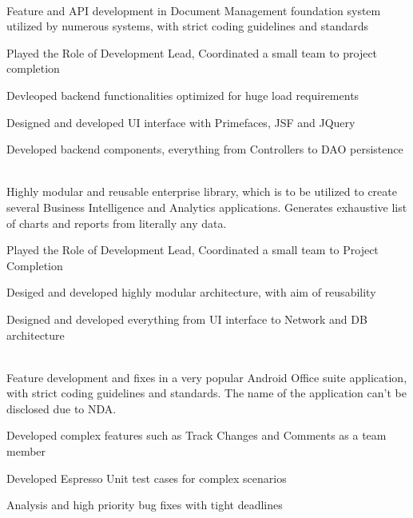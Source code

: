 \documentclass[]{deedy-resume-openfont}
\begin{document}
\hfill {}\\
Feature and API development in Document Management foundation system utilized by numerous systems, with strict coding guidelines and standards\\
\begin{tightemize}
	\item Played the Role of Development Lead, Coordinated a small team to project completion
	\item Devleoped backend functionalities optimized for huge load requirements
	\item Designed and developed UI interface with Primefaces, JSF and JQuery
	\item Developed backend components, everything from Controllers to DAO persistence
\end{tightemize}
\sectionsep
  
\clearpage
{}
\hfill {}\\
Highly modular and reusable enterprise library, which is to be utilized to create several Business Intelligence and Analytics applications. Generates exhaustive list of charts and reports from literally any data.\\
\begin{tightemize}
	\item Played the Role of Development Lead, Coordinated a small team to Project Completion
	\item Desiged and developed highly modular architecture, with aim of reusability
	\item Designed and developed everything from UI interface to Network and DB architecture
\end{tightemize}
\sectionsep
  

\\
Feature development and fixes in a very popular Android Office suite application, with strict coding guidelines and standards. The name of the application can’t be disclosed due to NDA.\\
\begin{tightemize}
	\item Developed complex features such as Track Changes and Comments as a team member
	\item Developed Espresso Unit test cases for complex scenarios
	\item Analysis and high priority bug fixes with tight deadlines
\end{tightemize}
\sectionsep
%
%
\end{document}
